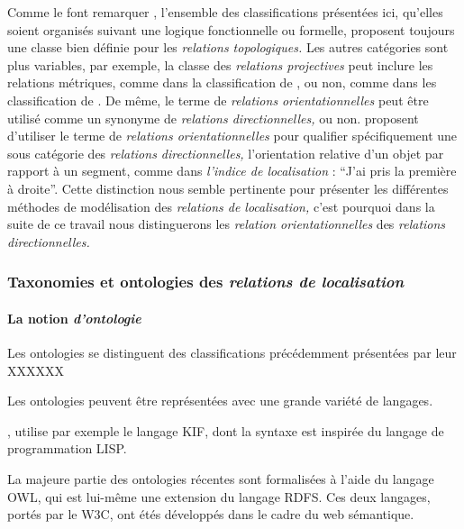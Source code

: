 Comme le font remarquer \textcite{Duchene2019}, l'ensemble des
classifications présentées ici, qu'elles soient organisés suivant une
logique fonctionnelle ou formelle, proposent toujours une classe bien
définie pour les \emph{relations topologiques.} Les autres catégories
sont plus variables, par exemple, la classe des \emph{relations
  projectives} peut inclure les relations métriques, comme dans la
classification de \textcite{Borillo1998}, ou non, comme dans les
classification de \textcite{Bateman2010, Pustejovsky2017}. De même, le
terme de \emph{relations orientationnelles} peut être utilisé comme un
synonyme de \emph{relations directionnelles,} ou
non. \textcite{Duchene2019} proposent d'utiliser le terme de
\emph{relations orientationnelles} pour qualifier spécifiquement une
sous catégorie des\emph{ relations directionnelles,} l'orientation
relative d'un objet par rapport à un segment, comme dans
\emph{l'indice de localisation} : \enquote{J'ai pris la première à
  droite}. Cette distinction nous semble pertinente pour présenter les
différentes méthodes de modélisation des \emph{relations de
  localisation,} c'est pourquoi dans la suite de ce travail nous
distinguerons les \emph{relation orientationnelles} des
\emph{relations directionnelles.}

\subsubsection{Taxonomies et ontologies des \emph{relations de localisation}}

\paragraph{La notion \emph{d'ontologie}}

Les ontologies se distinguent des classifications précédemment
présentées par leur XXXXXX



Les ontologies peuvent être représentées avec une grande variété de
langages.

\textcite{Gruber1993}, utilise par exemple le langage KIF, dont la
syntaxe est inspirée du langage de programmation LISP.

La majeure partie des ontologies récentes sont formalisées à l'aide du
langage OWL, qui est lui-même une extension du langage RDFS. Ces deux
langages, portés par le W3C, ont étés développés dans le cadre du web
sémantique.

